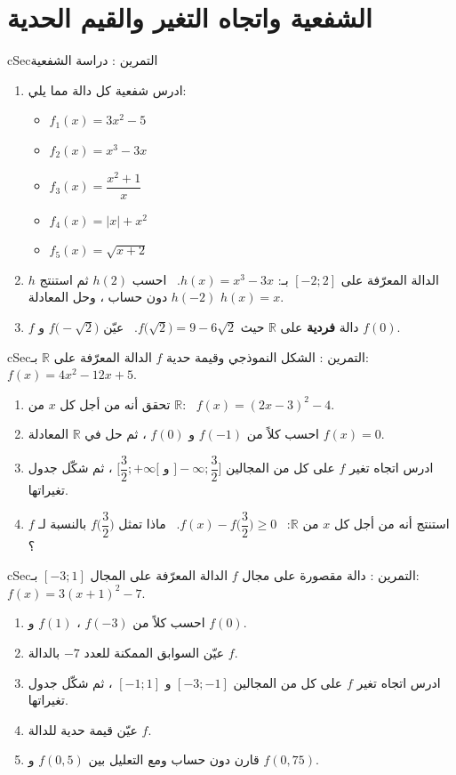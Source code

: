 \documentclass[12pt,a4paper]{article}
\newenvironment{BOX}[2]{\begin{otherlanguage}{english}\begin{arbox}{#1}{#2}}{\end{arbox}\end{otherlanguage}}
\newcounter{exo}
\newenvironment{tamrin}[1]{\stepcounter{exo}\begin{BOX}{cSec}{التمرين \theexo: #1}}{\end{BOX}}
\newcommand{\R}{\mathbb{R}}
\newenvironment{sq}{\begin{itemize}[leftmargin=2.4em,itemsep=3pt]}{\end{itemize}}
\newcommand{\qa}{\item[(أ)]}\newcommand{\qb}{\item[(ب)]}\newcommand{\qc}{\item[(جـ)]}\newcommand{\qd}{\item[(د)]}\newcommand{\qe}{\item[(هـ)]}
\begin{document}
\section{الشفعية واتجاه التغير والقيم الحدية}
\begin{tamrin}{دراسة الشفعية}
\begin{enumerate}
\item ادرس شفعية كل دالة مما يلي:
\begin{sq}
\qa $f_1(x)=3x^2-5$
\qb $f_2(x)=x^3-3x$
\qc $f_3(x)=\dfrac{x^2+1}{x}$
\qd $f_4(x)=|x|+x^2$
\qe $f_5(x)=\sqrt{x+2}$
\end{sq}
\item $h$ الدالة المعرّفة على $[-2;2]$ بـ: $h(x)=x^3-3x$. \ احسب $h(2)$ ثم استنتج $h(-2)$ دون حساب ، وحل المعادلة $h(x)=x$.
\item $f$ دالة \textbf{فردية} على $\R$ حيث $f\big(\sqrt2\big)=9-6\sqrt2$. \ عيّن $f\big(-\sqrt2\big)$ و $f(0)$.
\end{enumerate}
\end{tamrin}

\begin{tamrin}{الشكل النموذجي وقيمة حدية}
$f$ الدالة المعرّفة على $\R$ بـ: $f(x)=4x^2-12x+5$.
\begin{enumerate}
\item تحقق أنه من أجل كل $x$ من $\R$: \ $f(x)=(2x-3)^2-4$.
\item احسب كلاً من $f(-1)$ و $f(0)$ ، ثم حل في $\R$ المعادلة $f(x)=0$.
\item ادرس اتجاه تغير $f$ على كل من المجالين $\Big]-\infty;\dfrac32\Big]$ و $\Big[\dfrac32;+\infty\Big[$ ، ثم شكّل جدول تغيراتها.
\item استنتج أنه من أجل كل $x$ من $\R$: \ $f(x)-f\Big(\dfrac32\Big)\ge0$. \ ماذا تمثل $f\Big(\dfrac32\Big)$ بالنسبة لـ $f$؟
\end{enumerate}
\end{tamrin}

\begin{tamrin}{دالة مقصورة على مجال}
$f$ الدالة المعرّفة على المجال $[-3;1]$ بـ: $f(x)=3(x+1)^2-7$.
\begin{enumerate}
\item احسب كلاً من $f(-3)$ ، $f(1)$ و $f(0)$.
\item عيّن السوابق الممكنة للعدد $-7$ بالدالة $f$.
\item ادرس اتجاه تغير $f$ على كل من المجالين $[-3;-1]$ و $[-1;1]$ ، ثم شكّل جدول تغيراتها.
\item عيّن قيمة حدية للدالة $f$.
\item قارن دون حساب ومع التعليل بين $f(0{,}5)$ و $f(0{,}75)$.
\end{enumerate}
\end{tamrin}
\end{document}
